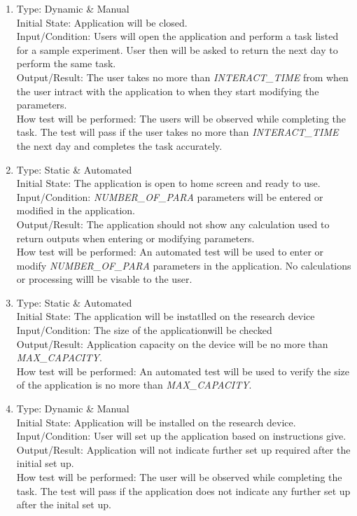 \documentclass[12pt, titlepage]{article}
\begin{document}
\begin{adjustwidth}{2.2em}{0pt}
\begin{enumerate}[{NF-UT}1.]
  \item Type: Dynamic \& Manual\\
  Initial State: Application will be closed.\\
  Input/Condition: Users will open the application and perform a task listed for a sample experiment. User then will be asked to return the next day to perform the same task.\\
  Output/Result:  The user takes no more than \textsl{INTERACT\_TIME} from when the user intract with the application to when they start modifying the parameters.\\
  How test will be performed: The users will be observed while completing the task. The test will pass if the user takes no more than \textsl{INTERACT\_TIME} the next day and completes the task accurately.

  \item Type: Static \& Automated\\
  Initial State: The application is open to home screen  and ready to use.\\
  Input/Condition: \textsl{NUMBER\_OF\_PARA} parameters will be entered or modified in the application.\\
  Output/Result: The  application should not show any calculation used to return outputs when entering or modifying parameters. \\
  How test will be performed: An automated test will be used to enter or modify \textsl{NUMBER\_OF\_PARA} parameters in the application. No calculations or processing willl be visable to the user.

  \item Type: Static \& Automated\\
  Initial State: The application will be instatlled on the research device\\
  Input/Condition: The size of the applicationwill be checked\\
  Output/Result: Application capacity on the device will be no more than \textsl{MAX\_CAPACITY}. \\
  How test will be performed: An automated test will be used to verify the size of the application is no more than \textsl{MAX\_CAPACITY}.

  \item Type: Dynamic \& Manual\\
  Initial State: Application will be installed on the research device.\\
  Input/Condition: User will set up the application based on instructions give.\\
  Output/Result: Application will not indicate further set up required after the initial set up.\\
  How test will be performed: The user will be observed while completing the task. The  test will pass if  the application does not indicate any further set up after the inital set up.  
\end{enumerate}
\end{adjustwidth}
\end{document}
